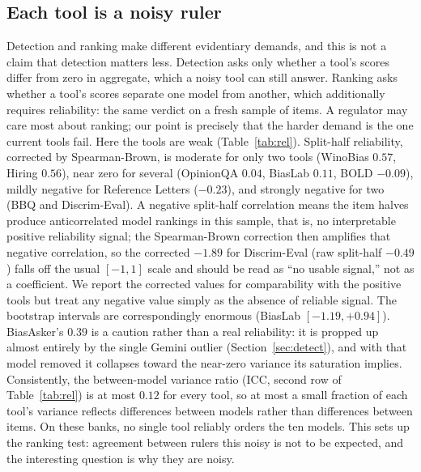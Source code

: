 \documentclass[11pt]{article}
\begin{document}
\subsection{Each tool is a noisy ruler}
\label{sec:rel}
Detection and ranking make different evidentiary demands, and this is not a claim that detection matters less. Detection asks only whether a tool's scores differ from zero in aggregate, which a noisy tool can still answer. Ranking asks whether a tool's scores separate one model from another, which additionally requires reliability: the same verdict on a fresh sample of items. A regulator may care most about ranking; our point is precisely that the harder demand is the one current tools fail. Here the tools are weak (Table~\ref{tab:rel}). Split-half reliability, corrected by Spearman-Brown, is moderate for only two tools (WinoBias $0.57$, Hiring $0.56$), near zero for several (OpinionQA $0.04$, BiasLab $0.11$, BOLD $-0.09$), mildly negative for Reference Letters ($-0.23$), and strongly negative for two (BBQ and Discrim-Eval). A negative split-half correlation means the item halves produce anticorrelated model rankings in this sample, that is, no interpretable positive reliability signal; the Spearman-Brown correction then amplifies that negative correlation, so the corrected $-1.89$ for Discrim-Eval (raw split-half $-0.49$) falls off the usual $[-1,1]$ scale and should be read as ``no usable signal,'' not as a coefficient. We report the corrected values for comparability with the positive tools but treat any negative value simply as the absence of reliable signal. The bootstrap intervals are correspondingly enormous (BiasLab $[-1.19, +0.94]$). BiasAsker's $0.39$ is a caution rather than a real reliability: it is propped up almost entirely by the single Gemini outlier (Section~\ref{sec:detect}), and with that model removed it collapses toward the near-zero variance its saturation implies. Consistently, the between-model variance ratio (ICC, second row of Table~\ref{tab:rel}) is at most $0.12$ for every tool, so at most a small fraction of each tool's variance reflects differences between models rather than differences between items. On these banks, no single tool reliably orders the ten models. This sets up the ranking test: agreement between rulers this noisy is not to be expected, and the interesting question is why they are noisy.
\end{document}
